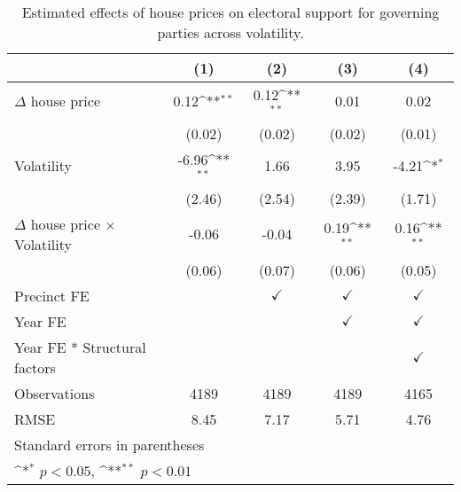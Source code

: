 \begin{table}[htbp]\centering
\def\sym#1{\ifmmode^{#1}\else\(^{#1}\)\fi}
\caption{Estimated effects of house prices on electoral support for governing parties across volatility.} \label{tab5}
\begin{tabular}{l*{4}{c}}
\hline\hline
                    &\multicolumn{1}{c}{(1)}        &\multicolumn{1}{c}{(2)}        &\multicolumn{1}{c}{(3)}        &\multicolumn{1}{c}{(4)}        \\
\hline
$\Delta$ house price&        0.12\sym{**}&        0.12\sym{**}&        0.01        &        0.02        \\
                    &      (0.02)        &      (0.02)        &      (0.02)        &      (0.01)        \\
[1em]
Volatility          &       -6.96\sym{**}&        1.66        &        3.95        &       -4.21\sym{*} \\
                    &      (2.46)        &      (2.54)        &      (2.39)        &      (1.71)        \\
[1em]
$\Delta$ house price $\times$ Volatility&       -0.06        &       -0.04        &        0.19\sym{**}&        0.16\sym{**}\\
                    &      (0.06)        &      (0.07)        &      (0.06)        &      (0.05)        \\
[1em]
\hline Precinct FE  &                    &$\checkmark$        &$\checkmark$        &$\checkmark$        \\
[1em]
Year FE             &                    &                    &$\checkmark$        &$\checkmark$        \\
[1em]
Year FE * Structural factors&                    &                    &                    &$\checkmark$        \\
\hline
Observations        &        4189        &        4189        &        4189        &        4165        \\
RMSE                &        8.45        &        7.17        &        5.71        &        4.76        \\
\hline\hline
\multicolumn{5}{l}{\footnotesize Standard errors in parentheses}\\
\multicolumn{5}{l}{\footnotesize \sym{*} \(p<0.05\), \sym{**} \(p<0.01\)}\\
\end{tabular}
\end{table}
